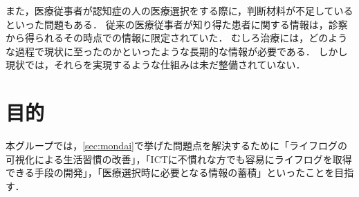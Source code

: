 \documentclass[../report]{subfiles}
\begin{document}
また，医療従事者が認知症の人の医療選択をする際に，判断材料が不足しているといった問題もある．
従来の医療従事者が知り得た患者に関する情報は，診察から得られるその時点での情報に限定されていた．
むしろ治療には，どのような過程で現状に至ったのかといったような長期的な情報が必要である．
しかし現状では，それらを実現するような仕組みは未だ整備されていない．

\section{目的}
本グループでは，\ref{sec:mondai}で挙げた問題点を解決するために「ライフログの可視化による生活習慣の改善」，「ICTに不慣れな方でも容易にライフログを取得できる手段の開発」，「医療選択時に必要となる情報の蓄積」といったことを目指す．
\end{document}
